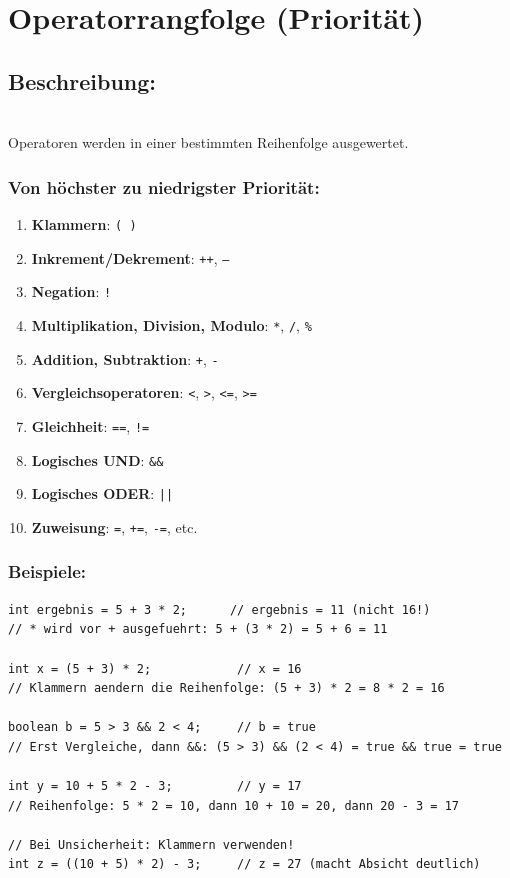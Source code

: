 \newpage


\section*{Operatorrangfolge (Priorität)}

\subsection*{Beschreibung:}\\
Operatoren werden in einer bestimmten Reihenfolge ausgewertet.

\subsubsection*{Von höchster zu niedrigster Priorität:}

\begin{enumerate}
	\item \textbf{Klammern}: \texttt{( )}
	\item \textbf{Inkrement/Dekrement}: \texttt{++}, \texttt{--}
	\item \textbf{Negation}: \texttt{!}
	\item \textbf{Multiplikation, Division, Modulo}: \texttt{*}, \texttt{/}, \texttt{\%}
	\item \textbf{Addition, Subtraktion}: \texttt{+}, \texttt{-}
	\item \textbf{Vergleichsoperatoren}: \texttt{<}, \texttt{>}, \texttt{<=}, \texttt{>=}
	\item \textbf{Gleichheit}: \texttt{==}, \texttt{!=}
	\item \textbf{Logisches UND}: \texttt{\&\&}
	\item \textbf{Logisches ODER}: \texttt{||}
	\item \textbf{Zuweisung}: \texttt{=}, \texttt{+=}, \texttt{-=}, etc.
\end{enumerate}

\subsubsection*{Beispiele:}
\begin{lstlisting}
int ergebnis = 5 + 3 * 2;      // ergebnis = 11 (nicht 16!)
// * wird vor + ausgefuehrt: 5 + (3 * 2) = 5 + 6 = 11

int x = (5 + 3) * 2;            // x = 16
// Klammern aendern die Reihenfolge: (5 + 3) * 2 = 8 * 2 = 16

boolean b = 5 > 3 && 2 < 4;     // b = true
// Erst Vergleiche, dann &&: (5 > 3) && (2 < 4) = true && true = true

int y = 10 + 5 * 2 - 3;         // y = 17
// Reihenfolge: 5 * 2 = 10, dann 10 + 10 = 20, dann 20 - 3 = 17

// Bei Unsicherheit: Klammern verwenden!
int z = ((10 + 5) * 2) - 3;     // z = 27 (macht Absicht deutlich)
\end{lstlisting}

